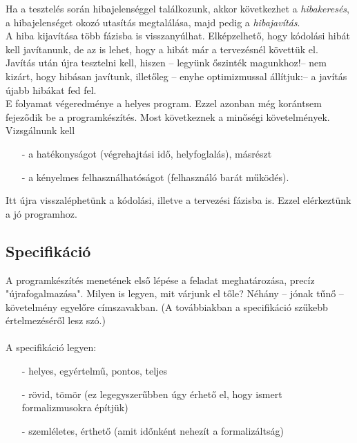 \documentclass[12pt,margin=0px]{article}
\begin{document}
    \noindent Ha a tesztelés során hibajelenséggel találkozunk, akkor következhet a \emph{hibakeresés}, a hibajelenséget okozó utasítás megtalálása, majd pedig a \emph{hibajavítás}.\\

    \noindent A hiba kijavítása több fázisba is visszanyúlhat. Elképzelhető, hogy kódolási hibát kell javítanunk, de az is lehet, hogy a hibát már a tervezésnél követtük el.\\

    \noindent Javítás után újra tesztelni kell, hiszen – legyünk őszinték magunkhoz!– nem kizárt, hogy hibásan javítunk, illetőleg – enyhe optimizmussal állítjuk:– a javítás újabb hibákat fed fel.\\
	
    \noindent E folyamat végeredménye a helyes program. Ezzel azonban még korántsem fejeződik be a programkészítés. Most következnek a minőségi követelmények. Vizsgálnunk kell
    \begin{itemize}
        \item[-] a hatékonyságot (végrehajtási idő, helyfoglalás), másrészt
        \item[-] a kényelmes felhasználhatóságot (felhasználó barát működés).
    \end{itemize}

    \noindent Itt újra visszaléphetünk a kódolási, illetve a tervezési fázisba is. Ezzel elérkeztünk a jó programhoz.
	
	\subsection*{Specifikáció}

    A programkészítés menetének első lépése a feladat meghatározása, precíz "újrafogalmazása". Milyen is legyen, mit várjunk el tőle? Néhány – jónak tűnő – követelmény egyelőre címszavakban. (A továbbiakban a specifikáció szűkebb értelmezéséről lesz szó.)\\\\
    A specifikáció legyen:

	\begin{itemize}
		\item[-] helyes, egyértelmű, pontos, teljes
		\item[-] rövid, tömör
            \subitem (ez legegyszerűbben úgy érhető el, hogy ismert formalizmusokra építjük)
		\item[-] szemléletes, érthető
            \subitem (amit időnként nehezít a formalizáltság)
	\end{itemize}
	
\end{document}
